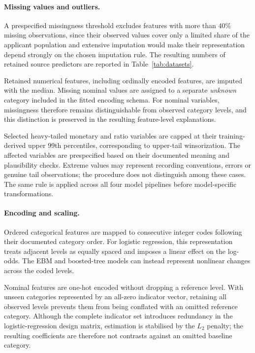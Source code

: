 \paragraph{Missing values and outliers.}
A prespecified missingness threshold excludes features with more than 40\%
missing observations, since their observed values cover only a limited share of
the applicant population and extensive imputation would make their representation
depend strongly on the chosen imputation rule. The resulting numbers of retained
source predictors are reported in Table~\ref{tab:datasets}. 


Retained numerical features, including ordinally encoded features, are imputed
with the median. Missing nominal values are assigned to a separate
\emph{unknown} category included in the fitted encoding schema. For nominal
variables, missingness therefore remains distinguishable from observed category
levels, and this distinction is preserved in the resulting feature-level
explanations.

Selected heavy-tailed monetary and ratio variables are capped at their
training-derived upper 99th percentiles, corresponding to upper-tail
winsorization. The affected variables are prespecified based on their documented
meaning and plausibility checks. Extreme values may represent recording
conventions, errors or genuine tail observations; the procedure does not
distinguish among these cases. The same rule is applied across all four model
pipelines before model-specific transformations.

\paragraph{Encoding and scaling.}
Ordered categorical features are mapped to consecutive integer codes following
their documented category order. For logistic regression, this representation
treats adjacent levels as equally spaced and imposes a linear effect on the
log-odds. The EBM and boosted-tree models can instead represent nonlinear changes
across the coded levels.

Nominal features are one-hot encoded without dropping a reference level. With
unseen categories represented by an all-zero indicator vector, retaining all
observed levels prevents them from being conflated with an omitted reference
category. Although the complete indicator set introduces redundancy in the
logistic-regression design matrix, estimation is stabilised by the $L_2$ penalty;
the resulting coefficients are therefore not contrasts against an omitted
baseline category.

